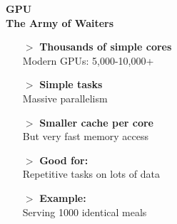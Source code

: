 \documentclass[10pt,a4paper,landscape]{article}
\begin{document}
\begin{minipage}[t]{0.32\textwidth}
\begin{gpubox}
\begin{center}
{\large \textcolor{gpugreen}{\textbf{GPU\\The Army of Waiters}}}
\end{center}

\vspace{3mm}

\begin{center}
\end{center}

\vspace{3mm}

\begin{itemize}[leftmargin=15pt,itemsep=2pt,topsep=0pt]
\item[\textcolor{gpugreen}{$>$}] \textbf{Thousands of simple cores}\\
Modern GPUs: 5,000-10,000+
\item[\textcolor{gpugreen}{$>$}] \textbf{Simple tasks}\\
Massive parallelism
\item[\textcolor{gpugreen}{$>$}] \textbf{Smaller cache per core}\\
But very fast memory access
\item[\textcolor{gpugreen}{$>$}] \textbf{Good for:}\\
Repetitive tasks on lots of data
\item[\textcolor{gpugreen}{$>$}] \textbf{Example:}\\
Serving 1000 identical meals
\end{itemize}
\end{gpubox}
\end{minipage}
\end{document}
